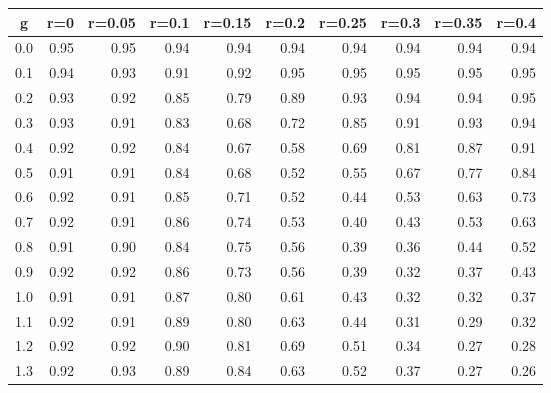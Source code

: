 %
\begin{table}[!tbp]
 \begin{center}
 \begin{tabular}{rrrrrrrrrr}\hline\hline
\multicolumn{1}{c}{g}&\multicolumn{1}{c}{r=0}&\multicolumn{1}{c}{r=0.05}&\multicolumn{1}{c}{r=0.1}&\multicolumn{1}{c}{r=0.15}&\multicolumn{1}{c}{r=0.2}&\multicolumn{1}{c}{r=0.25}&\multicolumn{1}{c}{r=0.3}&\multicolumn{1}{c}{r=0.35}&\multicolumn{1}{c}{r=0.4}\tabularnewline
\hline
0.0&0.95&0.95&0.94&0.94&0.94&0.94&0.94&0.94&0.94\tabularnewline
0.1&0.94&0.93&0.91&0.92&0.95&0.95&0.95&0.95&0.95\tabularnewline
0.2&0.93&0.92&0.85&0.79&0.89&0.93&0.94&0.94&0.95\tabularnewline
0.3&0.93&0.91&0.83&0.68&0.72&0.85&0.91&0.93&0.94\tabularnewline
0.4&0.92&0.92&0.84&0.67&0.58&0.69&0.81&0.87&0.91\tabularnewline
0.5&0.91&0.91&0.84&0.68&0.52&0.55&0.67&0.77&0.84\tabularnewline
0.6&0.92&0.91&0.85&0.71&0.52&0.44&0.53&0.63&0.73\tabularnewline
0.7&0.92&0.91&0.86&0.74&0.53&0.40&0.43&0.53&0.63\tabularnewline
0.8&0.91&0.90&0.84&0.75&0.56&0.39&0.36&0.44&0.52\tabularnewline
0.9&0.92&0.92&0.86&0.73&0.56&0.39&0.32&0.37&0.43\tabularnewline
1.0&0.91&0.91&0.87&0.80&0.61&0.43&0.32&0.32&0.37\tabularnewline
1.1&0.92&0.91&0.89&0.80&0.63&0.44&0.31&0.29&0.32\tabularnewline
1.2&0.92&0.92&0.90&0.81&0.69&0.51&0.34&0.27&0.28\tabularnewline
1.3&0.92&0.93&0.89&0.84&0.63&0.52&0.37&0.27&0.26\tabularnewline
\hline
\end{tabular}

\end{center}

\end{table}

